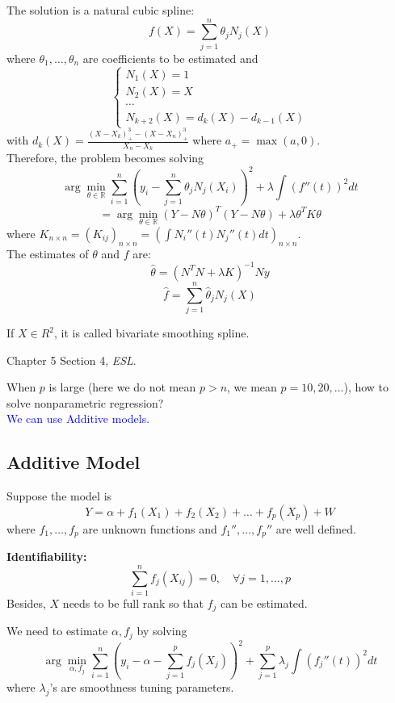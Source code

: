 \documentclass[12pt]{book}
\theoremstyle{definition}
\theoremstyle{remark}
\newcommand{\R}{\mathbb{R}}
\begin{document}
The solution is a natural cubic spline: 
\[f(X) = \sum_{j=1}^n\theta_jN_j(X)\]
where $\theta_1, \dots, \theta_n$ are coefficients to be estimated and 
\[\left\{\begin{matrix}N_1(X) = 1
 \\N_2(X) = X
 \\\cdots
 \\N_{k+2}(X) = d_k(X) - d_{k-1}(X)
\end{matrix}\right.\]
with $d_k(X) = \frac{(X-X_k)^3_+ - (X-X_n)^3_+}{X_n-X_k}$ where $a_+ = \max(a,0)$.\\


Therefore, the problem becomes solving
\[\arg\underset{\theta\in\R}{\min}\sum_{i=1}^n(y_i- \sum_{j=1}^n\theta_jN_j(X_i))^2+\lambda \int (f''(t))^2dt\]
\[ = \arg\underset{\theta\in\R}{\min}(Y-N\theta)^T(Y-N\theta)+\lambda \theta^TK\theta\]
where $K_{n\times n} =(K_{ij})_{n\times n} = (\int N_i''(t)N_j''(t)dt)_{n\times n}$.\\

The estimates of $\theta$ and $f$ are:
\[\hat{\theta} = (N^TN+\lambda K)^{-1}Ny\]
\[\hat{f} = \sum_{j=1}^n\hat{\theta}_jN_j(X)\]


If $X\in R^2$, it is called bivariate smoothing spline.

\begin{referencebox}
    Chapter 5 Section 4, \textit{ESL}.
\end{referencebox}



When $p$ is large (here we do not mean $p>n$, we mean $p=10, 20,\dots$), how to solve nonparametric regression?\\

\textcolor{blue}{We can use Additive models.}

\subsection{Additive Model}
Suppose the model is 
\[Y = \alpha+f_1(X_1)+f_2(X_2)+\dots+f_p(X_p)+W\]
where $f_1,\dots,f_p$ are unknown functions and $f_1'',\dots,f_p''$ are well defined.


\textbf{Identifiability: }\\
\[\sum_{i=1}^nf_j(X_{ij}) = 0,\quad \forall j = 1,\dots,p\]
Besides, $X$ needs to be full rank so that $f_j$ can be estimated.

We need to estimate $\alpha, f_j$ by solving 
\[\arg\underset{\alpha, f_j}{\min}\sum_{i=1}^n(y_i-\alpha- \sum_{j=1}^pf_j(X_j))^2+\sum_{j=1}^p\lambda_j \int (f_j''(t))^2dt\]
where $\lambda_j$'s are smoothness tuning parameters.\\
\end{document}
